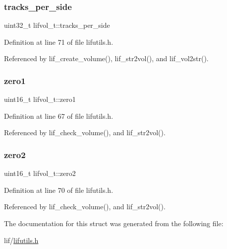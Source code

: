 \subsubsection{\texorpdfstring{tracks\+\_\+per\+\_\+side}{tracks\_per\_side}}
{\footnotesize\ttfamily uint32\+\_\+t lifvol\+\_\+t\+::tracks\+\_\+per\+\_\+side}



Definition at line 71 of file lifutils.\+h.



Referenced by lif\+\_\+create\+\_\+volume(), lif\+\_\+str2vol(), and lif\+\_\+vol2str().

\mbox{\label{structlifvol__t_a5e749ae4bff79deaa813966cff04f431}} 
\subsubsection{\texorpdfstring{zero1}{zero1}}
{\footnotesize\ttfamily uint16\+\_\+t lifvol\+\_\+t\+::zero1}



Definition at line 67 of file lifutils.\+h.



Referenced by lif\+\_\+check\+\_\+volume(), and lif\+\_\+str2vol().

\mbox{\label{structlifvol__t_ac05fef8e2c908110de7083d7afbfdb37}} 
\subsubsection{\texorpdfstring{zero2}{zero2}}
{\footnotesize\ttfamily uint16\+\_\+t lifvol\+\_\+t\+::zero2}



Definition at line 70 of file lifutils.\+h.



Referenced by lif\+\_\+check\+\_\+volume(), and lif\+\_\+str2vol().



The documentation for this struct was generated from the following file\+:\begin{DoxyCompactItemize}
\item 
lif/\hyperlink{lifutils_8h}{lifutils.\+h}\end{DoxyCompactItemize}
